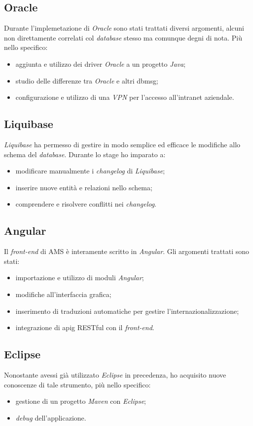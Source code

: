 \subsection{Oracle}
Durante l'implemetazione di \textit{Oracle} sono stati trattati diversi argomenti, alcuni non direttamente correlati col \textit{database} stesso ma comunque degni di nota. Più nello specifico:
\begin{itemize}
    \item aggiunta e utilizzo dei driver \textit{Oracle} a un progetto \textit{Java};
    \item studio delle differenze tra \textit{Oracle} e altri \gls{dbmsg};
    \item configurazione e utilizzo di una \textit{VPN} per l'accesso all'intranet aziendale.
\end{itemize}

\subsection{Liquibase}
\textit{Liquibase} ha permesso di gestire in modo semplice ed efficace le modifiche allo schema del \textit{database}. Durante lo stage ho imparato a:
\begin{itemize}
    \item modificare manualmente i \textit{changelog} di \textit{Liquibase};
    \item inserire nuove entità e relazioni nello schema;
    \item comprendere e risolvere conflitti nei \textit{changelog}.
\end{itemize}

\subsection{Angular}
Il \textit{front-end} di AMS è interamente scritto in \textit{Angular}. Gli argomenti trattati sono stati:
\begin{itemize}
    \item importazione e utilizzo di moduli \textit{Angular};
    \item modifiche all'interfaccia grafica;
    \item inserimento di traduzioni automatiche per gestire l'internazionalizzazione;
    \item integrazione di \gls{apig} RESTful con il \textit{front-end}.
\end{itemize}

\subsection{Eclipse}
Nonostante avessi già utilizzato \textit{Eclipse} in precedenza, ho acquisito nuove conoscenze di tale strumento, più nello specifico:
\begin{itemize}
    \item gestione di un progetto \textit{Maven} con \textit{Eclipse};
    \item \textit{debug} dell'applicazione.
\end{itemize}

